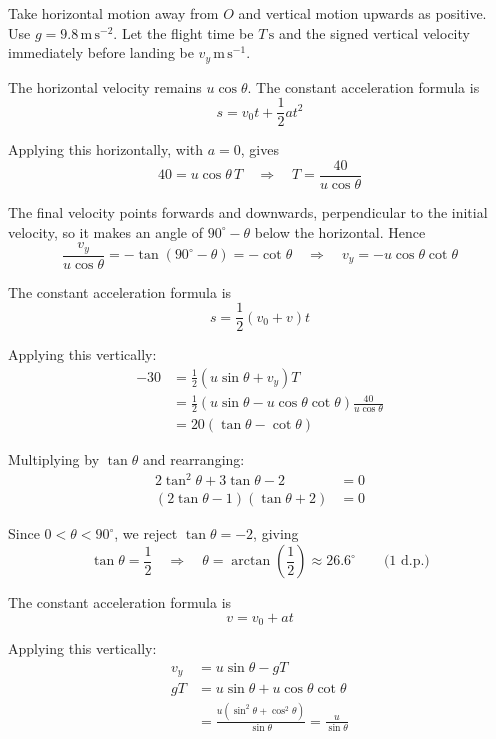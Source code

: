\documentclass[leqno]{article}
\begin{document}
\begin{enumerate}[
  label=\textbf{\arabic*.},
  leftmargin=*,
  topsep=0pt,
  partopsep=0pt,
  parsep=0pt
]
\begin{djsSolution}
\begin{djsSolutionFigure}
\end{djsSolutionFigure}

Take horizontal motion away from \(O\) and vertical motion upwards as positive. Use \(g=9.8\,\mathrm{m\,s^{-2}}\). Let the flight time be \(T\,\mathrm{s}\) and the signed vertical velocity immediately before landing be \(v_y\,\mathrm{m\,s^{-1}}\).

The horizontal velocity remains \(u\cos\theta\). The constant acceleration formula is
\[
s=v_0t+\frac12at^2
\]

Applying this horizontally, with \(a=0\), gives
\[
40=u\cos\theta\,T
\quad\Longrightarrow\quad
T=\frac{40}{u\cos\theta}
\]

The final velocity points forwards and downwards, perpendicular to the initial velocity, so it makes an angle of \(90^\circ-\theta\) below the horizontal. Hence
\[
\frac{v_y}{u\cos\theta}=-\tan(90^\circ-\theta)=-\cot\theta
\quad\Longrightarrow\quad
v_y=-u\cos\theta\cot\theta
\]

The constant acceleration formula is
\[
s=\frac12(v_0+v)t
\]

Applying this vertically:
\begin{align*}
-30&=\frac12(u\sin\theta+v_y)T\\
&=\frac12\left(u\sin\theta-u\cos\theta\cot\theta\right)
\frac{40}{u\cos\theta}\\
&=20(\tan\theta-\cot\theta)
\end{align*}

Multiplying by \(\tan\theta\) and rearranging:
\begin{align*}
2\tan^2\theta+3\tan\theta-2&=0\\
(2\tan\theta-1)(\tan\theta+2)&=0
\end{align*}

Since \(0<\theta<90^\circ\), we reject \(\tan\theta=-2\), giving
\[
\tan\theta=\frac12
\quad\Longrightarrow\quad
\theta=\arctan\left(\frac12\right)\approx26.6^\circ
\qquad\text{(1 d.p.)}
\]

The constant acceleration formula is
\[
v=v_0+at
\]

Applying this vertically:
\begin{align*}
v_y&=u\sin\theta-gT\\
gT&=u\sin\theta+u\cos\theta\cot\theta\\
&=\frac{u(\sin^2\theta+\cos^2\theta)}{\sin\theta}
=\frac{u}{\sin\theta}
\end{align*}


\end{djsSolution}
\end{enumerate}
\end{document}
